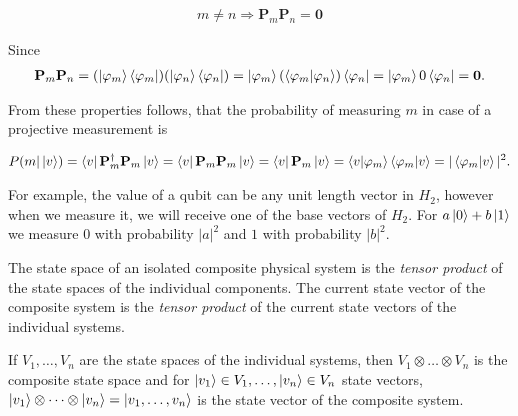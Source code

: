 \begin{property}

\begin{align*}
m \neq n \Rightarrow \mathbf{P}_m\mathbf{P}_n = \mathbf{0}
\end{align*}

Since
\begin{align*}
\mathbf{P}_m\mathbf{P}_n =
(\ket{\varphi_m}\bra{\varphi_m})(\ket{\varphi_n}\bra{\varphi_n}) =
\ket{\varphi_m}(\bra{\varphi_m}\ket{\varphi_n})\bra{\varphi_n} =
\ket{\varphi_m}0\bra{\varphi_n} =
\mathbf{0}.
\end{align*}

\end{property}

From these properties follows, that the probability of measuring $m$ in case of a projective measurement is

\begin{align*}
P(m | \ket{v}) =
\bra{v}\mathbf{P}_m^{\dagger}\mathbf{P}_m \ket{v} =
\bra{v}\mathbf{P}_m\mathbf{P}_m\ket{v} = 
\bra{v}\mathbf{P}_m\ket{v} =
\bra{v}\ket{\varphi_m}\bra{\varphi_m}\ket{v} = |\bra{\varphi_m}\ket{v}|^2.
\end{align*}

For example, the value of a qubit can be any unit length vector in $H_2$, however when we measure it, we will receive one of the base vectors of $H_2$. For $a\ket{0} + b\ket{1}$ we measure $0$ with probability $|a|^2$ and $1$ with probability $|b|^2$.

\label{PostulateIV}

The state space of an isolated composite physical system is the \textit{tensor product} of the state spaces of the individual components. The current state vector of the composite system is the \textit{tensor product} of the current state vectors of the individual systems.

If $V_1,\dots,V_n$ are the state spaces of the individual systems, then $V_1 \otimes \dots \otimes V_n$ is the composite state space and for $\ket{v_1} \in V_1, \dots, \ket{v_n} \in V_n$ state vectors, $\ket{v_1} \otimes \dots \otimes \ket{v_n} = \ket{v_1,\dots,v_n}$ is the state vector of the composite system.

